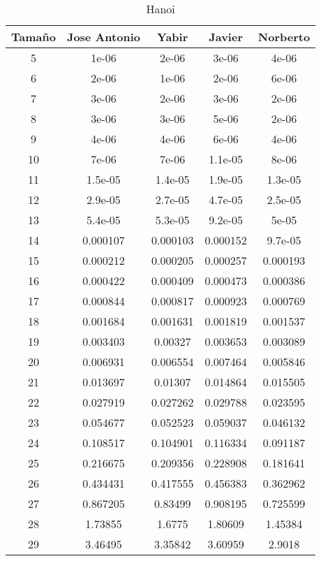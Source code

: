 \documentclass{article}
\begin{document}
\newpage

\begin{table}[h]
	\centering
	\caption{Hanoi}
\begin{tabular}{ | c | c  | c | c | c | }
  \hline
   Tama\~no & Jose Antonio & Yabir & Javier & Norberto\\ 
   \hline
5	&	1e-06	&	2e-06	&	3e-06	&	4e-06	\\
6	&	2e-06	&	1e-06	&	2e-06	&	6e-06	\\
7	&	3e-06	&	2e-06	&	3e-06	&	2e-06	\\
8	&	3e-06	&	3e-06	&	5e-06	&	2e-06	\\
9	&	4e-06	&	4e-06	&	6e-06	&	4e-06	\\
10	&	7e-06	&	7e-06	&	1.1e-05	&	8e-06	\\
11	&	1.5e-05	&	1.4e-05	&	1.9e-05	&	1.3e-05	\\
12	&	2.9e-05	&	2.7e-05	&	4.7e-05	&	2.5e-05	\\
13	&	5.4e-05	&	5.3e-05	&	9.2e-05	&	5e-05	\\
14	&	0.000107	&	0.000103	&	0.000152	&	9.7e-05	\\
15	&	0.000212	&	0.000205	&	0.000257	&	0.000193	\\
16	&	0.000422	&	0.000409	&	0.000473	&	0.000386	\\
17	&	0.000844	&	0.000817	&	0.000923	&	0.000769	\\
18	&	0.001684	&	0.001631	&	0.001819	&	0.001537	\\
19	&	0.003403	&	0.00327	&	0.003653	&	0.003089	\\
20	&	0.006931	&	0.006554	&	0.007464	&	0.005846	\\
21	&	0.013697	&	0.01307	&	0.014864	&	0.015505	\\
22	&	0.027919	&	0.027262	&	0.029788	&	0.023595	\\
23	&	0.054677	&	0.052523	&	0.059037	&	0.046132	\\
24	&	0.108517	&	0.104901	&	0.116334	&	0.091187	\\
25	&	0.216675	&	0.209356	&	0.228908	&	0.181641	\\
26	&	0.434431	&	0.417555	&	0.456383	&	0.362962	\\
27	&	0.867205	&	0.83499	&	0.908195	&	0.725599	\\
28	&	1.73855	&	1.6775	&	1.80609	&	1.45384	\\
29	&	3.46495	&	3.35842	&	3.60959	&	2.9018	\\
 \hline
\end{tabular}
\end{table}
\end{document}
